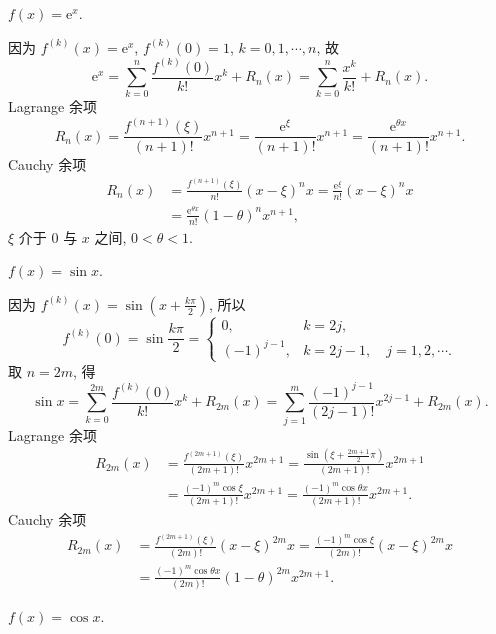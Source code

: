 \begin{example}\label{ex:4.1.2}
$f(x)=\mathrm{e}^{x}$.
\end{example}

\begin{solution}
因为 $f^{(k)}(x)=\mathrm{e}^{x}$, $f^{(k)}(0)=1$, $k=0,1,\cdots,n$, 故
\[
\mathrm{e}^{x}=\sum_{k=0}^{n}\frac{f^{(k)}(0)}{k!}x^{k}+R_{n}(x)=\sum_{k=0}^{n}\frac{x^{k}}{k!}+R_{n}(x).
\]
Lagrange 余项
\[
R_{n}(x)=\frac{f^{(n+1)}(\xi)}{(n+1)!}x^{n+1}=\frac{\mathrm{e}^{\xi}}{(n+1)!}x^{n+1}=\frac{\mathrm{e}^{\theta x}}{(n+1)!}x^{n+1}.
\]
Cauchy 余项
\begin{align*}
R_{n}(x)&=\frac{f^{(n+1)}(\xi)}{n!}(x-\xi)^{n}x=\frac{\mathrm{e}^{\xi}}{n!}(x-\xi)^{n}x\\
&=\frac{\mathrm{e}^{\theta x}}{n!}(1-\theta)^{n}x^{n+1},
\end{align*}
$\xi$ 介于 $0$ 与 $x$ 之间, $0<\theta<1$.
\end{solution}

\begin{example}\label{ex:4.1.3}
$f(x)=\sin x$.
\end{example}

\begin{solution}
因为 $f^{(k)}(x)=\sin\left(x+\frac{k\pi}{2}\right)$, 所以
\[
f^{(k)}(0)=\sin\frac{k\pi}{2}=\begin{cases}
0, & k=2j,\\
(-1)^{j-1}, & k=2j-1,\quad j=1,2,\cdots.
\end{cases}
\]
取 $n=2m$, 得
\[
\sin x=\sum_{k=0}^{2m}\frac{f^{(k)}(0)}{k!}x^{k}+R_{2m}(x)=\sum_{j=1}^{m}\frac{(-1)^{j-1}}{(2j-1)!}x^{2j-1}+R_{2m}(x).
\]
Lagrange 余项
\begin{align*}
R_{2m}(x)&=\frac{f^{(2m+1)}(\xi)}{(2m+1)!}x^{2m+1}=\frac{\sin\left(\xi+\frac{2m+1}{2}\pi\right)}{(2m+1)!}x^{2m+1}\\
&=\frac{(-1)^{m}\cos\xi}{(2m+1)!}x^{2m+1}=\frac{(-1)^{m}\cos\theta x}{(2m+1)!}x^{2m+1}.
\end{align*}
Cauchy 余项
\begin{align*}
R_{2m}(x)&=\frac{f^{(2m+1)}(\xi)}{(2m)!}(x-\xi)^{2m}x=\frac{(-1)^{m}\cos\xi}{(2m)!}(x-\xi)^{2m}x\\
&=\frac{(-1)^{m}\cos\theta x}{(2m)!}(1-\theta)^{2m}x^{2m+1}.
\end{align*}
\end{solution}

\begin{example}\label{ex:4.1.4}
$f(x)=\cos x$.
\end{example}

